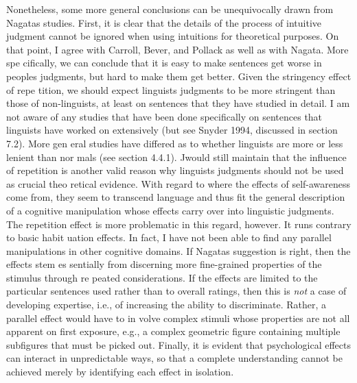 \begin{styleStandard}
Nonetheless, some more general conclusions can be unequivocally drawn from Nagata{\textquotesingle}s studies. First, it is clear that the details of the process of intuitive judgment cannot be ignored when using intuitions for theoretical purposes. On that point, I agree with Carroll, Bever, and Pollack as well as with Nagata. More spe\- cifically, we can conclude that it is easy to make sentences get worse in people{\textquotesingle}s judgments, but hard to make them get better. Given the stringency effect of repe\- tition, we should expect linguists{\textquotesingle} judgments to be more stringent than those of non-linguists, at least on sentences that they have studied in detail. I am not aware of any studies that have been done specifically on sentences that linguists have worked on extensively (but see Snyder 1994, discussed in section 7.2). More gen\- eral studies have differed as to whether linguists are more or less lenient than nor\- mals (see section 4.4.1). Jwould still maintain that the influence of repetition is another valid reason why linguists{\textquotesingle} judgments should not be used as crucial theo\- retical evidence. With regard to where the effects of self-awareness come from, they seem to transcend language and thus fit the general description of a cognitive manipulation whose effects carry over into linguistic judgments. The repetition effect is more problematic in this regard, however. It runs contrary to basic habit\- uation effects. In fact, I have not been able to find any parallel manipulations in other cognitive domains. If Nagata{\textquotesingle}s suggestion is right, then the effects stem es\- sentially from discerning more fine-grained properties of the stimulus through re\- peated considerations. If the effects are limited to the particular sentences used rather than to overall ratings, then this is \textit{not}\textit{ }a case of developing expertise, i.e., of increasing the ability to discriminate. Rather, a parallel effect would have to in\- volve complex stimuli whose properties are not all apparent on first exposure, e.g., a complex geometric figure containing multiple subfigures that must be picked out. Finally, it is evident that psychological effects can interact in unpredictable ways, so that a complete understanding cannot be achieved merely by identifying each effect in isolation.
\end{styleStandard}



